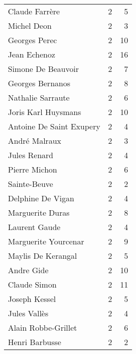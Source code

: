 \begin{xltabular}{\textwidth}{lrr}
                      Claude Farrère &          2 &                5 \\
                         Michel Deon &          2 &                3 \\
                       Georges Perec &          2 &               10 \\
                        Jean Echenoz &          2 &               16 \\
                  Simone De Beauvoir &          2 &                7 \\
                    Georges Bernanos &          2 &                8 \\
                   Nathalie Sarraute &          2 &                6 \\
                 Joris Karl Huysmans &          2 &               10 \\
            Antoine De Saint Exupery &          2 &                4 \\
                       André Malraux &          2 &                3 \\
                        Jules Renard &          2 &                4 \\
                       Pierre Michon &          2 &                6 \\
                        Sainte-Beuve &          2 &                2 \\
                   Delphine De Vigan &          2 &                4 \\
                    Marguerite Duras &          2 &                8 \\
                       Laurent Gaude &          2 &                4 \\
                Marguerite Yourcenar &          2 &                9 \\
                  Maylis De Kerangal &          2 &                5 \\
                          Andre Gide &          2 &               10 \\
                        Claude Simon &          2 &               11 \\
                       Joseph Kessel &          2 &                5 \\
                        Jules Vallès &          2 &                4 \\
                 Alain Robbe-Grillet &          2 &                6 \\
                      Henri Barbusse &          2 &                2 \\

\end{xltabular}
